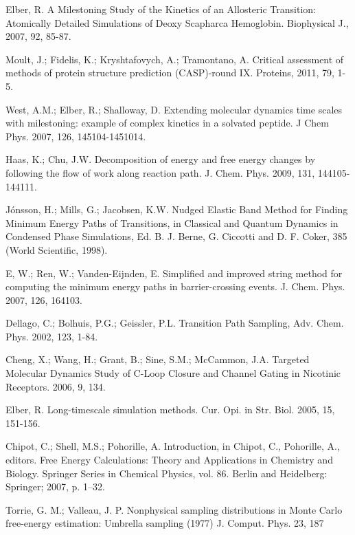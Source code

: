\documentclass[12pt]{article}
\begin{document}
\begin{thebibliography}{99}

Elber, R. A Milestoning Study of the Kinetics of an Allosteric Transition: Atomically Detailed Simulations of Deoxy Scapharca
Hemoglobin. Biophysical J., 2007, 92, 85-87.

Moult, J.; Fidelis, K.; Kryshtafovych, A.; Tramontano, A. Critical assessment of methods of protein structure prediction (CASP)-round IX.
Proteins, 2011, 79, 1-5.

West, A.M.; Elber, R.; Shalloway, D. Extending molecular dynamics time scales with milestoning: example of complex kinetics
in a solvated peptide. J Chem Phys. 2007, 126, 145104-1451014.

Haas, K.; Chu, J.W. Decomposition of energy and free energy changes by following the flow of work along reaction path.
J. Chem. Phys. 2009, 131, 144105-144111.

J\'{on}sson, H.; Mills, G.; Jacobsen, K.W. Nudged Elastic Band Method for Finding Minimum Energy Paths of Transitions,
in Classical and Quantum Dynamics in Condensed Phase Simulations, Ed. B. J. Berne, G. Ciccotti and D. F.
Coker, 385 (World Scientific, 1998).

E, W.; Ren, W.; Vanden-Eijnden, E. Simplified and improved string method for computing the minimum energy paths in
barrier-crossing events. J. Chem. Phys. 2007, 126, 164103.

Dellago, C.; Bolhuis, P.G.; Geissler, P.L. Transition Path Sampling, Adv. Chem. Phys. 2002, 123, 1-84.

Cheng, X.; Wang, H.; Grant, B.; Sine, S.M.; McCammon, J.A. Targeted Molecular Dynamics Study of C-Loop Closure
and Channel Gating in Nicotinic Receptors. 2006, 9, 134.

Elber, R. Long-timescale simulation methods. Cur. Opi. in Str. Biol. 2005, 15, 151-156.

Chipot, C.; Shell, M.S.; Pohorille, A. Introduction, in Chipot, C., Pohorille, A., editors. Free Energy
Calculations: Theory and Applications in Chemistry and Biology. Springer Series in Chemical
Physics, vol. 86. Berlin and Heidelberg: Springer; 2007, p. 1–32.

Torrie, G. M.; Valleau, J. P. Nonphysical sampling distributions in Monte Carlo free-energy estimation: Umbrella sampling
(1977) J. Comput. Phys. 23, 187


\end{thebibliography}
\end{document}
